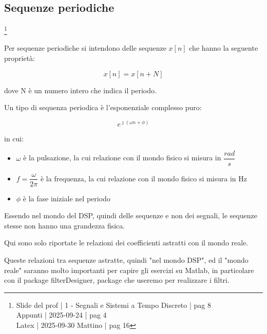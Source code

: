 \newpage 

\subsection{Sequenze periodiche}

\footnote{ 
    Slide del prof | 1 - Segnali e Sistemi a Tempo Discreto | pag 8 \\
    Appunti | 2025-09-24 | pag 4 \\ 
    Latex | 2025-09-30 Mattino | pag 16
}

Per sequenze periodiche si intendono delle sequenze $x \left[ n \right]$ che hanno la seguente proprietà: 

{
    \Large 
    \begin{equation}
        x \left[ n \right] 
        = 
        x \left[ n + N\right] 
    \end{equation}
}

dove N è un numero intero che indica il periodo. \newline 

Un tipo di sequenza periodica è l'esponenziale complesso puro: 

{
    \Large 
    \begin{equation}
        e^{\jmath \left( \omega n + \phi\right)}
    \end{equation}
}

in cui: 

\begin{itemize}
    \item $\omega$ è la pulsazione, la cui relazione con il mondo fisico si misura in $\dfrac{rad}{s}$ 
    \item $f = \dfrac{\omega}{2 \pi}$ è la frequenza, la cui relazione con il mondo fisico si misura in Hz 
    \item $\phi$ è la fase iniziale nel periodo
\end{itemize}

\begin{tcolorbox}
    Essendo nel mondo del DSP, quindi delle sequenze e non dei segnali, le sequenze stesse non hanno una grandezza fisica. \newline 

    Qui sono solo riportate le relazioni dei coefficienti astratti con il mondo reale. \newline 

    Queste relazioni tra sequenze astratte, quindi "nel mondo DSP", ed il "mondo reale" saranno molto importanti per capire gli esercizi su Matlab, 
    in particolare con il package filterDesigner, package che useremo per realizzare i filtri. 
\end{tcolorbox}

